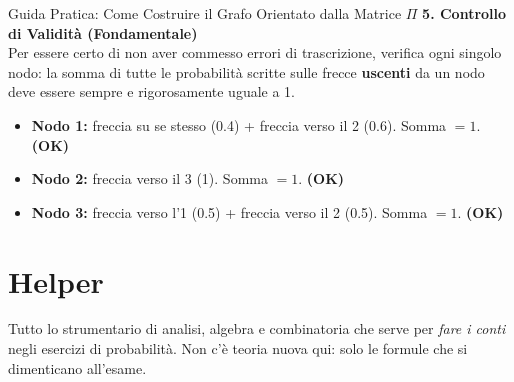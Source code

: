 \documentclass[12pt]{extarticle} %
\begin{document}
\begin{eserciziobox}{Guida Pratica: Come Costruire il Grafo Orientato dalla Matrice $\Pi$}
\textbf{5. Controllo di Validità (Fondamentale)} \\
Per essere certo di non aver commesso errori di trascrizione, verifica ogni singolo nodo: la somma di tutte le probabilità scritte sulle frecce \textbf{uscenti} da un nodo deve essere sempre e rigorosamente uguale a 1.
\begin{itemize}
    \item \textbf{Nodo 1:} freccia su se stesso (0.4) + freccia verso il 2 (0.6). Somma $= 1$. \color{codegreen}\textbf{(OK)}\color{black}
    \item \textbf{Nodo 2:} freccia verso il 3 (1). Somma $= 1$. \color{codegreen}\textbf{(OK)}\color{black}
    \item \textbf{Nodo 3:} freccia verso l'1 (0.5) + freccia verso il 2 (0.5). Somma $= 1$. \color{codegreen}\textbf{(OK)}\color{black}
\end{itemize}

\begin{center}
\end{center}
\end{eserciziobox}


\newpage

\section{Helper}
{\footnotesize Tutto lo strumentario di analisi, algebra e combinatoria che serve per \emph{fare i conti} negli esercizi di probabilità. Non c'è teoria nuova qui: solo le formule che si dimenticano all'esame.}
\end{document}
